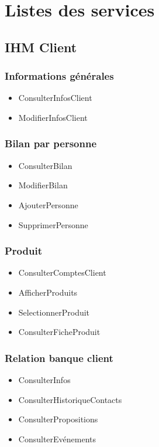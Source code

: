 \section{Listes des services}
\subsection{IHM Client}
\subsubsection*{Informations générales}
\begin{itemize}
\item ConsulterInfosClient
\item ModifierInfosClient
\end{itemize}
\subsubsection*{Bilan par personne}
\begin{itemize}
\item ConsulterBilan 
\item ModifierBilan 
\item AjouterPersonne 
\item SupprimerPersonne
\end{itemize}
\subsubsection*{Produit}
\begin{itemize}
\item ConsulterComptesClient 
\item AfficherProduits 
\item SelectionnerProduit 
\item ConsulterFicheProduit
\end{itemize}

\subsubsection*{Relation banque client}
\begin{itemize}
\item ConsulterInfos
\item ConsulterHistoriqueContacts  
\item ConsulterPropositions 
\item ConsulterEvénements 

\end{itemize}